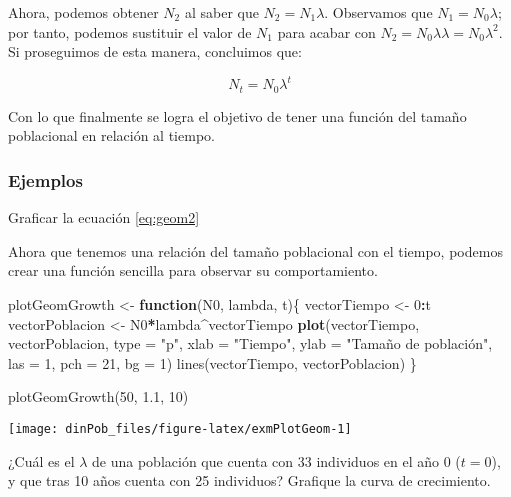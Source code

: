 \documentclass[12pt,letterpaper,]{book}
\newenvironment{Shaded}{\begin{snugshade}}{\end{snugshade}}
\newcommand{\KeywordTok}[1]{\textcolor[rgb]{0.13,0.29,0.53}{\textbf{#1}}}
\newcommand{\DataTypeTok}[1]{\textcolor[rgb]{0.13,0.29,0.53}{#1}}
\newcommand{\DecValTok}[1]{\textcolor[rgb]{0.00,0.00,0.81}{#1}}
\newcommand{\StringTok}[1]{\textcolor[rgb]{0.31,0.60,0.02}{#1}}
\newcommand{\ControlFlowTok}[1]{\textcolor[rgb]{0.13,0.29,0.53}{\textbf{#1}}}
\newcommand{\OperatorTok}[1]{\textcolor[rgb]{0.81,0.36,0.00}{\textbf{#1}}}
\newcommand{\NormalTok}[1]{#1}
\let\BeginKnitrBlock\begin \let\EndKnitrBlock\end
\begin{document}
Ahora, podemos obtener \(N_2\) al saber que \(N_2 = N_1 \lambda\).
Observamos que \(N_1 = N_0 \lambda\); por tanto, podemos sustituir el
valor de \(N_1\) para acabar con
\(N_2 = N_0 \lambda \lambda = N_0 \lambda^2\). Si proseguimos de esta
manera, concluimos que:

\begin{equation}
N_t = N_0 \lambda^t
 \label{eq:geom2}
\end{equation}

Con lo que finalmente se logra el objetivo de tener una función del
tamaño poblacional en relación al tiempo.

\subsubsection{Ejemplos}\label{ejemplos}

\BeginKnitrBlock{example}
\protect\hypertarget{exm:plotGeom}{}{\label{exm:plotGeom} }Graficar la
ecuación \eqref{eq:geom2}
\EndKnitrBlock{example}

Ahora que tenemos una relación del tamaño poblacional con el tiempo,
podemos crear una función sencilla para observar su comportamiento.

\begin{Shaded}
\begin{Highlighting}[]
\NormalTok{plotGeomGrowth <-}\StringTok{ }\ControlFlowTok{function}\NormalTok{(N0, lambda, t)\{}
\NormalTok{    vectorTiempo <-}\StringTok{ }\DecValTok{0}\OperatorTok{:}\NormalTok{t}
\NormalTok{    vectorPoblacion <-}\StringTok{ }\NormalTok{N0}\OperatorTok{*}\NormalTok{lambda}\OperatorTok{^}\NormalTok{vectorTiempo}
    \KeywordTok{plot}\NormalTok{(vectorTiempo, vectorPoblacion,}
         \DataTypeTok{type =} \StringTok{"p"}\NormalTok{, }\DataTypeTok{xlab =} \StringTok{"Tiempo"}\NormalTok{, }\DataTypeTok{ylab =} \StringTok{"Tamaño de población",}
\StringTok{         las = 1, pch = 21, bg = 1)}
\StringTok{    lines(vectorTiempo, vectorPoblacion)}
\StringTok{\}}

\StringTok{plotGeomGrowth(50, 1.1, 10)}
\end{Highlighting}
\end{Shaded}

\begin{center}\texttt{[image: dinPob\_files/figure-latex/exmPlotGeom-1]} \end{center}

\BeginKnitrBlock{example}
\protect\hypertarget{exm:GeomExm2}{}{\label{exm:GeomExm2} } ¿Cuál es el
\(\lambda\) de una población que cuenta con 33 individuos en el año 0
(\(t=0\)), y que tras 10 años cuenta con 25 individuos? Grafique la
curva de crecimiento.
\EndKnitrBlock{example}
\end{document}
